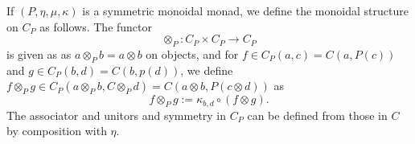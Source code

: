 \documentclass[12pt]{article}
\theoremstyle{definition}
\theoremstyle{remark}
\begin{document}
If $(P,\eta,\mu,\kappa)$ is a symmetric monoidal monad, we define the monoidal structure
on  $C_P$ as follows. The functor
\[
\otimes_P: C_P\times C_P\to C_P
\]
is given as as $a\otimes_P b=a\otimes b$ on objects, and for $f\in C_P(a,c)=C(a,P(c))$ and $g\in
C_P(b,d)=C(b,p(d))$, we define $f\otimes_P g\in C_P(a\otimes_P b, C\otimes_P d)=C(a\otimes
b, P(c\otimes d))$ as
\[
f\otimes_P g:= \kappa_{b,d}\circ (f\otimes g).
\]
The associator and unitors  and symmetry in $C_P$ can be defined from those in $C$ by composition with
$\eta$. 
\end{document}
